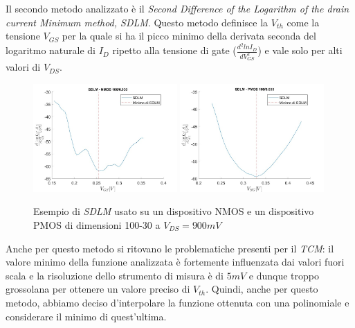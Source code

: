 \documentclass[12pt, letterpaper]{book}
\begin{document}
Il secondo metodo analizzato 
è il \emph{Second Difference of the Logarithm of the drain current Minimum method, SDLM}. Questo metodo definisce la $V_{th}$ come la tensione $V_{GS}$ per la quale si ha il picco minimo della derivata seconda del logaritmo naturale di $I_D$ ripetto alla tensione di gate ($\frac{d^2lnI_D}{dV_{GS}^2}$) e vale solo per alti valori di $V_{DS}$. \\

\begin{figure}[H]
  \centering
  \includegraphics[width=0.49\textwidth]{SDLM-N4-100-30-NoFit}
  \includegraphics[width=0.49\textwidth]{SDLM-P1-100-30-NoFit}
  \caption{Esempio di \emph{SDLM} usato su un dispositivo NMOS e un dispositivo PMOS di dimensioni 100-30 a $V_{DS} = 900 mV$}
\end{figure}


Anche per questo metodo si ritovano le problematiche
presenti per il \emph{TCM}: il valore minimo della funzione analizzata è fortemente influenzata dai valori fuori scala e la risoluzione dello strumento di misura è di $5 mV$ e dunque troppo grossolana per ottenere un valore preciso di $V_{th}$.
Quindi, anche per questo metodo, abbiamo deciso d'interpolare la funzione ottenuta con una polinomiale e considerare il minimo di quest'ultima. \\
\end{document}
